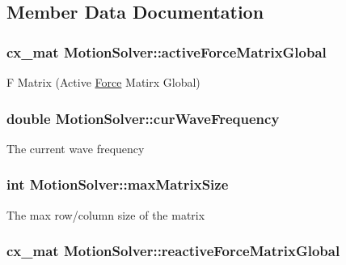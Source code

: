 \subsection{Member Data Documentation}
\hypertarget{class_motion_solver_a800bc918ff0075782368046bd51eeb87}{
\subsubsection[{active\-Force\-Matrix\-Global}]{\setlength{\rightskip}{0pt plus 5cm}cx\-\_\-mat Motion\-Solver\-::active\-Force\-Matrix\-Global}}\label{class_motion_solver_a800bc918ff0075782368046bd51eeb87}
F Matrix (Active \hyperlink{class_force}{Force} Matirx Global) \hypertarget{class_motion_solver_a01ca22785130c0612045094790e2f992}{
\subsubsection[{cur\-Wave\-Frequency}]{\setlength{\rightskip}{0pt plus 5cm}double Motion\-Solver\-::cur\-Wave\-Frequency}}\label{class_motion_solver_a01ca22785130c0612045094790e2f992}
The current wave frequency \hypertarget{class_motion_solver_af209f386af69a39839061e436630906c}{
\subsubsection[{max\-Matrix\-Size}]{\setlength{\rightskip}{0pt plus 5cm}int Motion\-Solver\-::max\-Matrix\-Size}}\label{class_motion_solver_af209f386af69a39839061e436630906c}
The max row/column size of the matrix \hypertarget{class_motion_solver_a29bb1f9a2fd145b4e8fc74ad711e4351}{
\subsubsection[{reactive\-Force\-Matrix\-Global}]{\setlength{\rightskip}{0pt plus 5cm}cx\-\_\-mat Motion\-Solver\-::reactive\-Force\-Matrix\-Global}}\label{class_motion_solver_a29bb1f9a2fd145b4e8fc74ad711e4351}
